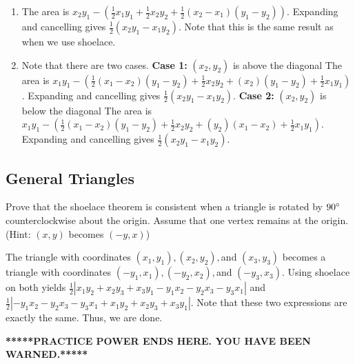 \documentclass[11pt]{article}
\begin{document}
\begin{solution}
\begin{enumerate}[label=(\alph*)]
\phantom{hello what's up}
\item The area is $x_2y_1 - (\frac{1}{2}x_1y_1+\frac{1}{2}x_2y_2+\frac{1}{2}(x_2-x_1)(y_1-y_2))$.
Expanding and cancelling gives $\frac{1}{2}(x_2y_1-x_1y_2)$. Note that this is the same result as when we use shoelace.

\item Note that there are two cases. 
\newline \textbf{Case 1:} $(x_2, y_2)$ is above the diagonal
The area is $x_1y_1 - (\frac{1}{2}(x_1-x_2)(y_1-y_2)+\frac{1}{2}x_2y_2+(x_2)(y_1-y_2)+\frac{1}{2}x_1y_1)$.
Expanding and cancelling gives $\frac{1}{2}(x_2y_1-x_1y_2)$. 
\newline \textbf{Case 2:} $(x_2, y_2)$ is below the diagonal
The area is $x_1y_1 - (\frac{1}{2}(x_1-x_2)(y_1-y_2)+\frac{1}{2}x_2y_2+(y_2)(x_1-x_2)+\frac{1}{2}x_1y_1)$.
Expanding and cancelling gives $\frac{1}{2}(x_2y_1-x_1y_2)$. 

\end{enumerate} \end{solution}

\subsection{General Triangles}

\begin{problem}  Prove that the shoelace theorem is consistent when a triangle is rotated by $90\degree$ counterclockwise about the origin. Assume that one vertex remains at the origin. (Hint: $(x, y)$ becomes $(-y, x)$)
\end{problem}

\begin{solution}
The triangle with coordinates $(x_1, y_1), (x_2, y_2),$and $(x_3, y_3)$ becomes a triangle with coordinates $(-y_1, x_1), (-y_2, x_2),$and $(-y_3, x_3)$. Using shoelace on both yields $\frac{1}{2}|x_1y_2+x_2y_3+x_3y_1-y_1x_2-y_2x_3-y_3x_1|$ and $\frac{1}{2}|-y_1x_2-y_2x_3-y_3x_1+x_1y_2+x_2y_3+x_3y_1|$. Note that these two expressions are exactly the same. Thus, we are done.
\end{solution}

\begin{center}\textbf{*****PRACTICE POWER ENDS HERE. YOU HAVE BEEN WARNED.*****}\end{center}
\end{document}
